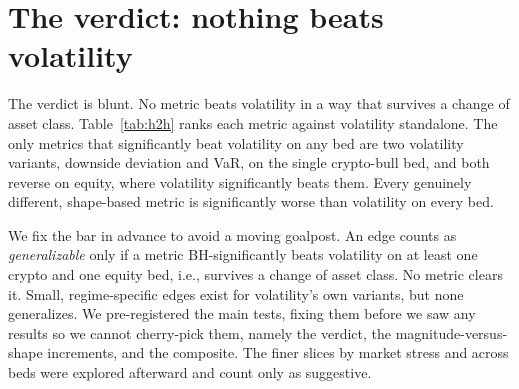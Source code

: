 \documentclass[sigconf,anonymous,nonacm]{acmart}
\begin{document}
\section{The verdict: nothing beats volatility}\label{sec:verdict}
The verdict is blunt. No metric beats volatility in a way that
survives a change of asset class. Table~\ref{tab:h2h} ranks each metric against
volatility standalone. The only metrics that significantly beat volatility on
any bed are two volatility variants, downside deviation and VaR, on the single
crypto-bull bed, and both reverse on equity, where volatility significantly beats them.
Every genuinely different, shape-based metric is significantly worse than
volatility on every bed.

We fix the bar in advance to avoid a moving goalpost. An edge counts as
\emph{generalizable} only if a metric BH-significantly beats volatility on at least one
crypto and one equity bed, i.e., survives a change of asset class. No metric
clears it. Small, regime-specific edges exist for volatility's own variants, but none
generalizes. We pre-registered the main tests, fixing them before
we saw any results so we cannot cherry-pick them, namely the verdict, the
magnitude-versus-shape increments, and the composite. The finer slices by market stress
and across beds were explored afterward and count only as suggestive.
\end{document}
